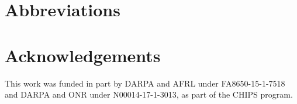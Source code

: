 \section[Abbreviations]{Abbreviations}
\label{sec:Abbreviations}

\printacronyms[include-classes=abbrev,name={Acronyms}]

\section{Acknowledgements}
\label{sec:Acknowledgements}
This work was funded in part by DARPA and AFRL under FA8650-15-1-7518 and DARPA and ONR under N00014-17-1-3013, as part of the CHIPS program.


